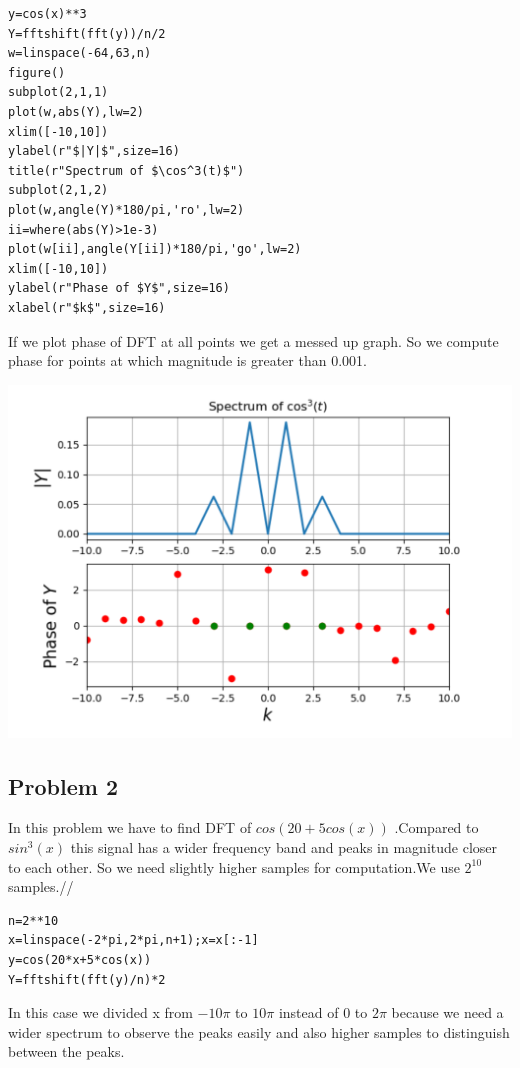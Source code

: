 \documentclass[10pt,english, openany]{book}
\begin{document}
\begin{verbatim}
y=cos(x)**3
Y=fftshift(fft(y))/n/2
w=linspace(-64,63,n)
figure()
subplot(2,1,1)
plot(w,abs(Y),lw=2)
xlim([-10,10])
ylabel(r"$|Y|$",size=16)
title(r"Spectrum of $\cos^3(t)$")
subplot(2,1,2)
plot(w,angle(Y)*180/pi,'ro',lw=2)
ii=where(abs(Y)>1e-3)
plot(w[ii],angle(Y[ii])*180/pi,'go',lw=2)
xlim([-10,10])
ylabel(r"Phase of $Y$",size=16)
xlabel(r"$k$",size=16)
\end{verbatim}
If we plot phase of DFT at all points we get a messed up graph. So we compute phase for points at which magnitude is greater than 0.001.

{\centering \includegraphics[scale=0.3]{Figure2.png}}

\subsection{Problem 2}

In this problem we have to find DFT of $ cos(20 + 5cos(x))$ .Compared to $sin^{3}(x)$ this signal has a wider frequency band and peaks in magnitude closer to each other. So we need slightly higher samples for computation.We use $2^{10}$ samples.//

\begin{verbatim}
n=2**10
x=linspace(-2*pi,2*pi,n+1);x=x[:-1]
y=cos(20*x+5*cos(x))
Y=fftshift(fft(y)/n)*2
\end{verbatim}

In this case we divided x from $ -10\pi$ to $10\pi$ instead of 0 to $ 2\pi$ because we need a wider spectrum to observe the peaks easily and also higher samples to distinguish between the peaks.\\
\end{document}
